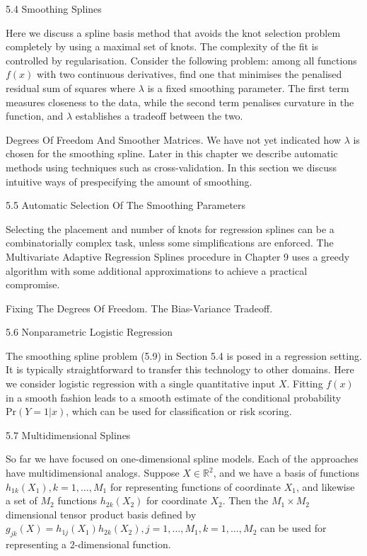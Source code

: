 5.4 Smoothing Splines

Here we discuss a spline basis method that avoids the knot selection problem completely by using a maximal set of knots. The complexity of the fit is controlled by regularisation. Consider the following problem: among all functions $f(x)$ with two continuous derivatives, find one that minimises the penalised residual sum of squares where $\lambda$ is a fixed smoothing parameter. The first term measures closeness to the data, while the second term penalises curvature in the function, and $\lambda$ establishes a tradeoff between the two.

Degrees Of Freedom And Smoother Matrices. We have not yet indicated how $\lambda$ is chosen for the smoothing spline. Later in this chapter we describe automatic methods using techniques such as cross-validation. In this section we discuss intuitive ways of prespecifying the amount of smoothing.

5.5 Automatic Selection Of The Smoothing Parameters

Selecting the placement and number of knots for regression splines can be a combinatorially complex task, unless some simplifications are enforced. The Multivariate Adaptive Regression Splines procedure in Chapter 9 uses a greedy algorithm with some additional approximations to achieve a practical compromise.

Fixing The Degrees Of Freedom. The Bias-Variance Tradeoff.

5.6 Nonparametric Logistic Regression

The smoothing spline problem (5.9) in Section 5.4 is posed in a regression setting. It is typically straightforward to transfer this technology to other domains. Here we consider logistic regression with a single quantitative input $X$. Fitting $f(x)$ in a smooth fashion leads to a smooth estimate of the conditional probability $\text{Pr}(Y=1|x)$, which can be used for classification or risk scoring.

5.7 Multidimensional Splines

So far we have focused on one-dimensional spline models. Each of the approaches have multidimensional analogs. Suppose $X \in \mathbb{R}^2$, and we have a basis of functions $h_{1k}(X_1),k=1,\dots ,M_1$ for representing functions of coordinate $X_1$, and likewise a set of $M_2$ functions $h_{2k}(X_2)$ for coordinate $X_2$. Then the $M_1 \times M_2$ dimensional tensor product basis defined by $g_{jk}(X) = h_{1j} (X_1) h_{2k}(X_2), j=1,\dots ,M_1, k=1,\dots ,M_2$ can be used for representing a $2$-dimensional function.


